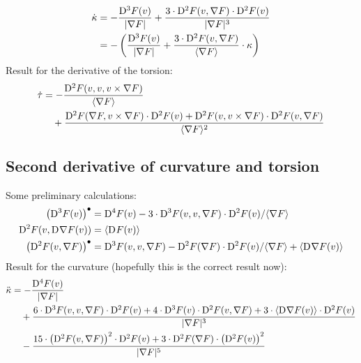 \begin{align}
    \dot{ \kappa }   &=
    - \frac{ \mathrm{D}^{ 3 }F( v ) }{ \lvert  \nabla F  \rvert }  +
    \frac{ 3 \cdot \mathrm{D}^{ 2 }F( v, \nabla F ) \cdot \mathrm{D}^{ 2 }F( v ) }{
    \lvert  \nabla F  \rvert^3 }   \\
    &=
    - \left( \frac{ \mathrm{D}^{ 3 }F( v ) }{ \lvert  \nabla F  \rvert }  +
    \frac{ 3 \cdot \mathrm{D}^{ 2 }F( v, \nabla F ) }{
    \langle \nabla F \rangle } \cdot \kappa \right)
\end{align}
Result for the derivative of the torsion:
\begin{align}
    \dot{ \tau }   &=
    - \frac{ \mathrm{D}^{ 2 }F( v, v, v \times \nabla F ) }{ \langle  \nabla F  \rangle }  \nonumber\\
    &\quad+  \frac{ \mathrm{D}^{ 2 }F( \nabla F, v \times \nabla F ) \cdot \mathrm{D}^{ 2 }F( v )  +
    \mathrm{D}^{ 2 }F( v, v \times \nabla F ) \cdot \mathrm{D}^{ 2 }F( v, \nabla F ) }{
    \langle  \nabla F  \rangle^2 }
\end{align}




\subsection{Second derivative of curvature and torsion}



Some preliminary calculations:
\begin{align}
    \left( \mathrm{D}^{ 3 }F( v ) \right)^\bullet   &=
    \mathrm{D}^{ 4 }F( v )  -
    3 \cdot \mathrm{D}^{ 3 }F( v, v, \nabla F ) \cdot \mathrm{D}^{ 2 }F( v ) / \langle \nabla F \rangle   \\
    \mathrm{D}^{ 2 }F( v, \mathrm{D}^{  }\nabla F( v ) )   &=
    \langle \mathrm{D}^{  }F( v ) \rangle   \\
    \left( \mathrm{D}^{ 2 }F( v, \nabla F ) \right)^\bullet   &=
    \mathrm{D}^{ 3 }F( v, v, \nabla F )  -
    \mathrm{D}^{ 2 }F( \nabla F ) \cdot \mathrm{D}^{ 2 }F( v ) / \langle \nabla F \rangle  +
    \langle \mathrm{D}^{  }\nabla F( v ) \rangle
\end{align}
Result for the curvature (hopefully this is the correct result now):
\begin{align}
    \ddot{\kappa}   &=
    - \frac{ \mathrm{D}^{ 4 }F( v ) }{ \lvert  \nabla F  \rvert }   \\
    &\quad+
    \frac{ 6 \cdot \mathrm{D}^{ 3 }F( v, v, \nabla F ) \cdot \mathrm{D}^{ 2 }F( v )  +
    4 \cdot \mathrm{D}^{ 3 }F( v ) \cdot \mathrm{D}^{ 2 }F( v, \nabla F )  +
    3 \cdot \langle \mathrm{D}^{  }\nabla F( v ) \rangle \cdot \mathrm{D}^{ 2 }F( v ) }{ \lvert  \nabla F  \rvert^3 }   \\
    &\quad-
    \frac{ 15 \cdot \left( \mathrm{D}^{ 2 }F( v, \nabla F ) \right)^2 \cdot \mathrm{D}^{ 2 }F( v )  +
    3 \cdot \mathrm{D}^{ 2 }F( \nabla F ) \cdot \left( \mathrm{D}^{ 2 }F( v ) \right)^2
    }{ \lvert  \nabla F  \rvert^5 }
\end{align}